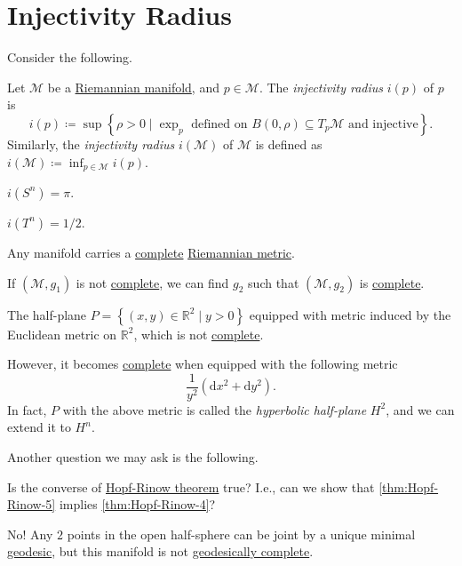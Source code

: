 \section{Injectivity Radius}
Consider the following.

\begin{definition}\label{def:injectivity-radius}
	Let \(\mathcal{M} \) be a \hyperref[def:Riemannian-manifold]{Riemannian manifold}, and \(p\in \mathcal{M} \). The \emph{injectivity radius} \(i(p)\) of \(p\) is
	\[
		i(p) \coloneqq \sup \left\{ \rho > 0 \mid \exp _p \text{ defined on \(B(0, \rho ) \subseteq T_p \mathcal{M} \) and injective}  \right\}.
	\]
	Similarly, the \emph{injectivity radius} \(i(\mathcal{M} )\) of \(\mathcal{M} \) is defined as \(i(\mathcal{M} )\coloneqq \inf _{p\in \mathcal{M} }i(p)\).
\end{definition}

\begin{eg}[Sphere]
	\(i(S^n) = \pi \).
\end{eg}

\begin{eg}[Torus]
	\(i(T^n) = 1 / 2\).
\end{eg}

Any manifold carries a \hyperref[def:geodesically-complete]{complete} \hyperref[def:Riemannian-metric]{Riemannian metric}.

If \((\mathcal{M} , g_1)\) is not \hyperref[def:geodesically-complete]{complete}, we can find \(g_2\) such that \((\mathcal{M} , g_2)\) is \hyperref[def:geodesically-complete]{complete}.

\begin{eg}
	The half-plane \(P=\left\{ (x, y)\in \mathbb{R} ^2 \mid y > 0 \right\}\) equipped with metric induced by the Euclidean metric on \(\mathbb{R} ^2\), which is not \hyperref[def:geodesically-complete]{complete}.

	However, it becomes \hyperref[def:geodesically-complete]{complete} when equipped with the following metric
	\[
		\frac{1}{y^2} (\mathrm{d} x^2 + \mathrm{d} y^2).
	\]
	In fact, \(P\) with the above metric is called the \emph{hyperbolic half-plane} \(H^2\), and we can extend it to \(H^n \).
\end{eg}

Another question we may ask is the following.

\begin{problem*}
	Is the converse of \hyperref[thm:Hopf-Rinow]{Hopf-Rinow theorem} true? I.e., can we show that \autoref{thm:Hopf-Rinow-5} implies \autoref{thm:Hopf-Rinow-4}?
\end{problem*}
\begin{answer}
	No! Any \(2\) points in the open half-sphere can be joint by a unique minimal \hyperref[def:geodesic]{geodesic}, but this manifold is not \hyperref[def:geodesically-complete]{geodesically complete}.
\end{answer}

